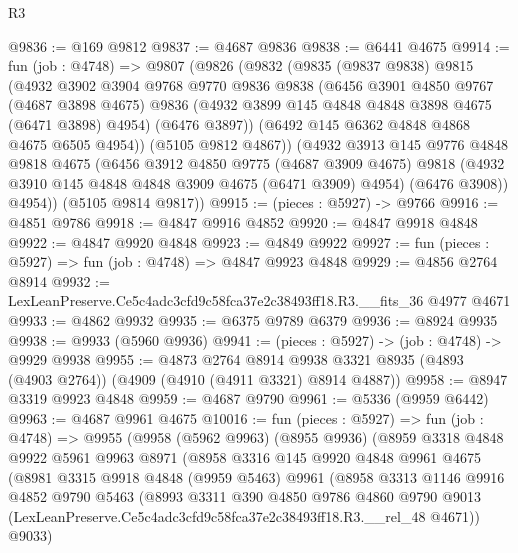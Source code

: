 \begin{lexlean}{R3}
\begin{coremodule}
@9836 := @169 @9812
@9837 := @4687 @9836
@9838 := @6441 @4675
@9914 := fun (job : @4748) =>
  @9807
    (@9826
      (@9832
        (@9835
          (@9837 @9838)
          @9815
          (@4932
            @3902
            @3904
            @9768
            @9770
            @9836
            @9838
            (@6456
              @3901
              @4850
              @9767
              (@4687 @3898 @4675)
              @9836
              (@4932 @3899 @145 @4848 @4848 @3898 @4675 (@6471 @3898) @4954)
              (@6476 @3897))
            (@6492 @145 @6362 @4848 @4868 @4675 @6505 @4954))
          (@5105 @9812 @4867))
        (@4932
          @3913
          @145
          @9776
          @4848
          @9818
          @4675
          (@6456
            @3912
            @4850
            @9775
            (@4687 @3909 @4675)
            @9818
            (@4932 @3910 @145 @4848 @4848 @3909 @4675 (@6471 @3909) @4954)
            (@6476 @3908))
          @4954))
      (@5105 @9814 @9817))
@9915 := (pieces : @5927) -> @9766
@9916 := @4851 @9786
@9918 := @4847 @9916 @4852
@9920 := @4847 @9918 @4848
@9922 := @4847 @9920 @4848
@9923 := @4849 @9922
@9927 := fun (pieces : @5927) => fun (job : @4748) => @4847 @9923 @4848
@9929 := @4856 @2764 @8914
@9932 := LexLeanPreserve.Ce5c4adc3cfd9c58fca37e2c38493ff18.R3.__fits_36 @4977 @4671
@9933 := @4862 @9932
@9935 := @6375 @9789 @6379
@9936 := @8924 @9935
@9938 := @9933 (@5960 @9936)
@9941 := (pieces : @5927) -> (job : @4748) -> @9929 @9938
@9955 := @4873
    @2764
    @8914
    @9938
    @3321
    @8935
    (@4893 (@4903 @2764))
    (@4909 (@4910 (@4911 @3321) @8914 @4887))
@9958 := @8947 @3319 @9923 @4848
@9959 := @4687 @9790
@9961 := @5336 (@9959 @6442)
@9963 := @4687 @9961 @4675
@10016 := fun (pieces : @5927) =>
  fun (job : @4748) =>
  @9955
    (@9958
      (@5962 @9963)
      (@8955 @9936)
      (@8959
        @3318
        @4848
        @9922
        @5961
        @9963
        @8971
        (@8958
          @3316
          @145
          @9920
          @4848
          @9961
          @4675
          (@8981
            @3315
            @9918
            @4848
            (@9959 @5463)
            @9961
            (@8958
              @3313
              @1146
              @9916
              @4852
              @9790
              @5463
              (@8993
                @3311
                @390
                @4850
                @9786
                @4860
                @9790
                @9013
                (LexLeanPreserve.Ce5c4adc3cfd9c58fca37e2c38493ff18.R3.__rel_48 @4671))
              @9033)

\end{coremodule}
\end{lexlean}
